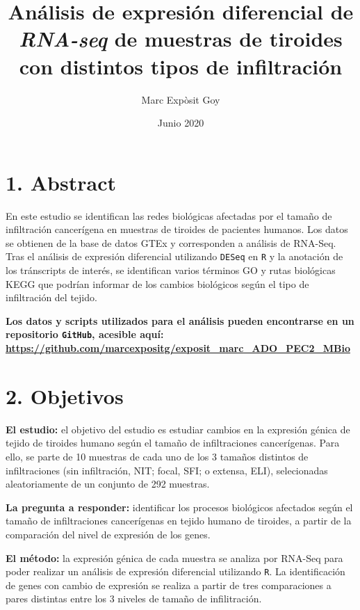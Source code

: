 \documentclass[
]{article}
\title{Análisis de expresión diferencial de \emph{RNA-seq} de muestras de
tiroides con distintos tipos de infiltración}
\author{Marc Expòsit Goy}
\date{Junio 2020}
\begin{document}
\maketitle

{
\setcounter{tocdepth}{3}
\tableofcontents
}
\newpage

\hypertarget{abstract}{%
\section{1. Abstract}\label{abstract}}

En este estudio se identifican las redes biológicas afectadas por el
tamaño de infiltración cancerígena en muestras de tiroides de pacientes
humanos. Los datos se obtienen de la base de datos GTEx y corresponden a
análisis de RNA-Seq. Tras el análisis de expresión diferencial
utilizando \texttt{DESeq} en \texttt{R} y la anotación de los
tránscripts de interés, se identifican varios términos GO y rutas
biológicas KEGG que podrían informar de los cambios biológicos según el
tipo de infiltración del tejido.

\textbf{Los datos y scripts utilizados para el análisis pueden
encontrarse en un repositorio \texttt{GitHub}, acesible aquí:
\url{https://github.com/marcexpositg/exposit_marc_ADO_PEC2_MBio}}

\hypertarget{objetivos}{%
\section{2. Objetivos}\label{objetivos}}

\textbf{El estudio:} el objetivo del estudio es estudiar cambios en la
expresión génica de tejido de tiroides humano según el tamaño de
infiltraciones cancerígenas. Para ello, se parte de 10 muestras de cada
uno de los 3 tamaños distintos de infiltraciones (sin infiltración, NIT;
focal, SFI; o extensa, ELI), selecionadas aleatoriamente de un conjunto
de 292 muestras.

\textbf{La pregunta a responder:} identificar los procesos biológicos
afectados según el tamaño de infiltraciones cancerígenas en tejido
humano de tiroides, a partir de la comparación del nivel de expresión de
los genes.

\textbf{El método:} la expresión génica de cada muestra se analiza por
RNA-Seq para poder realizar un análisis de expresión diferencial
utilizando \texttt{R}. La identificación de genes con cambio de
expresión se realiza a partir de tres comparaciones a pares distintas
entre los 3 niveles de tamaño de infilitración.
\end{document}
